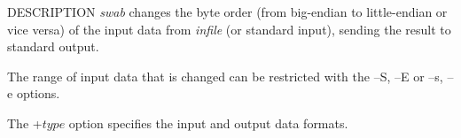 % 
% 
% 
% 
%                                                                        
%

\begin{synopsis}
\item [swab] [ --S $S_1$ ] [ --s $S_2$ ] [ --E $E_1$ ] [ --e $E_2$ ] 
 	    [ +$type$ ] [ {\em infile} ] 
\end{synopsis}

\begin{qsection}{DESCRIPTION}
{\em swab} changes the byte order 
(from big-endian to little-endian or vice versa) 
of the input data from {\em infile} (or standard input), 
sending the result to standard output.

The range of input data that is changed can be restricted 
with the --S, --E or --s, --e options.

The +$type$ option specifies the input and output data formats.
\end{qsection}

